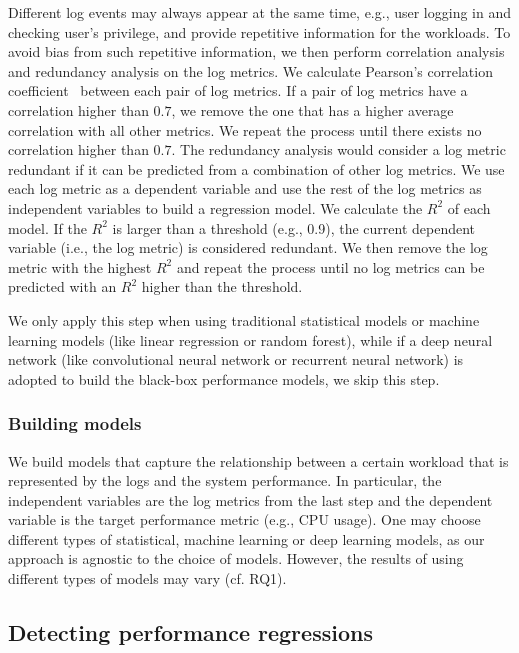 Different log events may always appear at the same time, e.g., user logging in and checking user's privilege, and provide repetitive information for the workloads. To avoid bias from such repetitive information, we then perform correlation analysis and redundancy analysis on the log metrics. We calculate Pearson's correlation coefficient~\citep{benesty2009pearson} between each pair of log metrics. If a pair of log metrics have a correlation higher than $0.7$, we remove the one that has a higher average correlation with all other metrics. 
We repeat the process until there exists no correlation higher than $0.7$. The redundancy analysis would consider a log metric redundant if it can be predicted from a combination of other log metrics. We use each log metric as a dependent variable and use the rest of the log metrics as independent variables to build a regression model. We calculate the $R^2$ of each model. If the $R^2$ is larger than a threshold (e.g., 0.9), the current dependent variable (i.e., the log metric) is considered redundant. We then remove the log metric with the highest $R^2$ and repeat the process until no log metrics can be predicted with an $R^2$ higher than the threshold. 

We only apply this step when using traditional statistical models or machine learning models (like linear regression or random forest), while if a deep neural network (like convolutional neural network or recurrent neural network) is adopted to build the black-box performance models, we skip this step.


\subsubsection{Building models}
We build models that capture the relationship between a certain workload that is represented by the logs and the system performance. In particular, the independent variables are the log metrics from the last step and the dependent variable is the target performance metric (e.g., CPU usage). One may choose different types of statistical, machine learning or deep learning models, as our approach is agnostic to the choice of models. However, the results of using different types of models may vary (cf. RQ1). 


\subsection{Detecting performance regressions} \label{sec:comparions-approaches}

